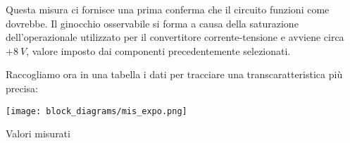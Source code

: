 Questa misura ci fornisce una prima conferma che il circuito funzioni come dovrebbe. Il
ginocchio osservabile si forma a causa della saturazione dell'operazionale utilizzato per il
convertitore corrente-tensione e avviene circa $+8\ V$, valore imposto dai componenti
precedentemente selezionati.

Raccogliamo ora in una tabella i dati per tracciare una transcaratteristica più precisa:

\begin{minipage}{0.49\textwidth}
    \centering
    \texttt{[image: block\_diagrams/mis\_expo.png]}
    \label{mis_expo}
\end{minipage}
\begin{minipage}{0.49\textwidth}
    \centering
    \begin{table}[H]
        \centering
        \caption{Valori misurati}
        \label{expo_table}
    \end{table}
\end{minipage}

